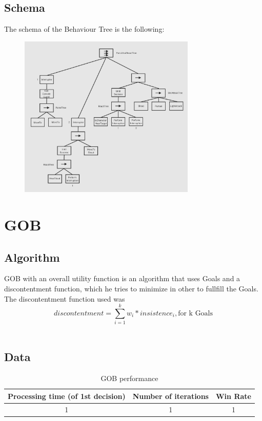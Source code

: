 \documentclass{article}
\begin{document}
  \subsection{Schema}
  The schema of the Behaviour Tree is the following:
  \begin{figure}[h]
    \centering
    \includegraphics[width=0.75\textwidth ]{Schema.jpg}
  \end{figure}
  \section{GOB}
  \subsection{Algorithm}
  GOB with an overall utility function is an algorithm that uses Goals and a discontentment function, which he tries to minimize in other to fullfill the Goals. \\
  The discontentment function used was \[discontentment = \sum_{i=1}^{k}w_i * insistence_i, \text{for k Goals}\]\\ 
  \subsection{Data}
  \begin{table}[h!]
    \centering
    \caption{GOB performance}
    \label{tab:tableGOB1}
    \begin{tabular}{c|c|c}
      \textbf{Processing time (of 1st decision)} & \textbf{Number of iterations} & \textbf{Win Rate}\\
      \hline
      1 & 1 & 1
    \end{tabular}
  \end{table}
\end{document}
